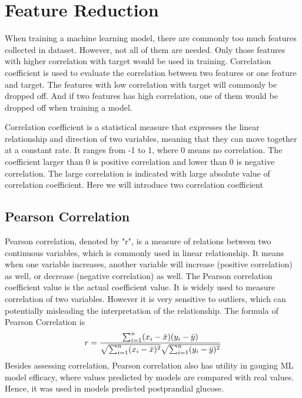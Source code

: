 \documentclass[12pt,a4paper,english
]{tunithesis}
\begin{document}
\section{Feature Reduction}
When training a machine learning model, there are commonly too much features collected in dataset. However, not all of them are needed. Only those features with higher correlation with target would be used in training. Correlation coefficient is used to evaluate the correlation between two features or one feature and target. The features with low correlation with target will commonly be dropped off. And if two features has high correlation, one of them would be dropped off when training a model. 

Correlation coefficient is a statistical measure that expresses the linear relationship and direction of two variables, meaning that they can move together at a constant rate. It ranges from -1 to 1, where 0 means no correlation. The coefficient larger than 0 is positive correlation and lower than 0 is negative correlation. The large correlation is indicated with large absolute value of correlation coefficient. Here we will introduce two correlation coefficient

\subsection{Pearson Correlation}
Pearson correlation, denoted by "r", is a measure of relations between two continuous variables, which is commonly used in linear relationship. It means when one variable increases, another variable will increase (positive correlation) as well, or decrease (negative correlation) as well. The Pearson correlation coefficient value is the actual coefficient value. It is widely used to measure correlation of two variables. However it is very sensitive to outliers, which can potentially misleading the interpretation of the relationship. The formula of Pearson Correlation is
\begin{equation*}
  r =
  \frac{ \sum_{i=1}^{n}(x_i-\bar{x})(y_i-\bar{y}) }{%
        \sqrt{\sum_{i=1}^{n}(x_i-\bar{x})^2}\sqrt{\sum_{i=1}^{n}(y_i-\bar{y})^2}}
\end{equation*}
Besides assessing correlation, Pearson correlation also has utility in gauging ML model efficacy, where values predicted by models are compared with real values. Hence, it was used in models predicted postprandial glucose. \parencite{kirk2021} 
\end{document}
